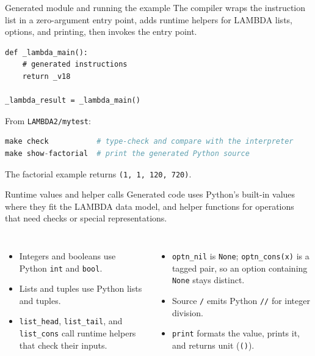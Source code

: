 \documentclass[aspectratio=169,10pt]{beamer}
\begin{document}
\begin{frame}[fragile]{Generated module and running the example}
  The compiler wraps the instruction list in a zero-argument entry point, adds runtime helpers for LAMBDA lists, options, and printing, then invokes the entry point.
  \begin{lstlisting}
def _lambda_main():
    # generated instructions
    return _v18

_lambda_result = _lambda_main()
  \end{lstlisting}
  From \texttt{LAMBDA2/mytest}:
  \begin{lstlisting}[language=Python]
make check           # type-check and compare with the interpreter
make show-factorial  # print the generated Python source
  \end{lstlisting}
  The factorial example returns \texttt{(1, 1, 120, 720)}.
\end{frame}

\begin{frame}[fragile]{Runtime values and helper calls}
  Generated code uses Python's built-in values where they fit the LAMBDA data
  model, and helper functions for operations that need checks or special
  representations.
  \begin{columns}[T]
    \begin{itemize}
      \item Integers and booleans use Python \texttt{int} and \texttt{bool}.
      \item Lists and tuples use Python lists and tuples.
      \item \texttt{list\_head}, \texttt{list\_tail}, and \texttt{list\_cons}
        call runtime helpers that check their inputs.
    \end{itemize}
    \begin{itemize}
      \item \texttt{optn\_nil} is \texttt{None}; \texttt{optn\_cons(x)} is a
        tagged pair, so an option containing \texttt{None} stays distinct.
      \item Source \texttt{/} emits Python \texttt{//} for integer division.
      \item \texttt{print} formats the value, prints it, and returns unit
        (\texttt{()}).
    \end{itemize}
  \end{columns}
\end{frame}
\end{document}
